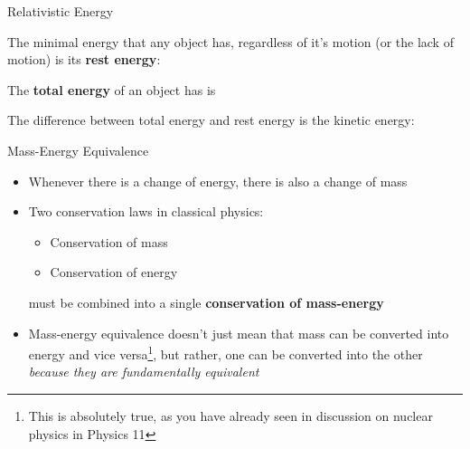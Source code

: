\documentclass[12pt,compress,aspectratio=169]{beamer}
\begin{document}
\begin{frame}{Relativistic Energy}%


  \vspace{-.1in}The minimal energy that any object has, regardless of it's
  motion (or the lack of motion) is its \textbf{rest energy}:
  
  
  \vspace{-.13in}The \textbf{total energy} of an object has is
   

  \vspace{-.1in}The difference between total energy and rest energy is the
  kinetic energy:
  
\end{frame}



\begin{frame}{Mass-Energy Equivalence}%
 
  \begin{itemize}
  \item\vspace{-.2in}Whenever there is a change of energy, there is also a
    change of mass
  \item Two conservation laws in classical physics:
    \begin{itemize}
    \item Conservation of mass
    \item Conservation of energy
    \end{itemize}
    must be combined into a single \textbf{conservation of mass-energy}
  \item Mass-energy equivalence doesn't just mean that mass can be converted
    into energy and vice versa\footnote{This is absolutely true, as you have
    already seen in discussion on nuclear physics in Physics 11}, but rather,
    one can be converted into the other \emph{because they are fundamentally
    equivalent}
  \end{itemize}
\end{frame}
\end{document}
